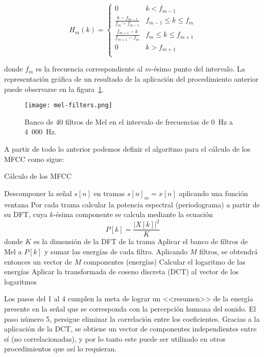 \begin{equation}
    \label{eq:Mel filterbank}
    H_m(k) = \begin{cases}
                 0 & k < f_{m-1} \\
                 \frac{k-f_{m-1}}{f_m - f_{m-1}} & f_{m-1}\leq k\leq f_m \\
                 \frac{f_{m+1}-k}{f_{m+1}-f_m} & f_m \leq k\leq f_{m+1} \\
                 0 & k > f_{m+1} \\
    \end{cases}
\end{equation}

\noindent
donde $f_m$ es la frecuencia correspondiente al $m$-ésimo punto del intervalo.
La representación gráfica de un resultado de la aplicación del procedimiento anterior puede observarse en la figura~\ref{img:mel-filters}.

\begin{figure}[!h]
    \centering
    \texttt{[image: mel-filters.png]}
    \caption{Banco de 40 filtros de Mel en el intervalo de frecuencias de 0~Hz a 4~000~Hz.}
    \label{img:mel-filters}
\end{figure}

A partir de todo lo anterior podemos definir el algoritmo para el cálculo de los MFCC como sigue:

\begin{algorithm}
    \caption{Cálculo de los MFCC}
    \label{algorithm:MFCC}
    Descomponer la señal $s[n]$ en tramas $s[n]_m = x[n]$ aplicando una función ventana\;
    Por cada trama calcular la potencia espectral (periodograma) a partir de su DFT, cuya $k$-ésima componente se calcula mediante la ecuación
    \begin{equation*}
        P[k] = \frac{|X[k]|^2}{K}
    \end{equation*}
    donde $K$ es la dimensión de la DFT de la trama\;
    Aplicar el banco de filtros de Mel a $P[k]$ y sumar las energías de cada filtro.
    Aplicando $M$ filtros, se obtendrá entonces un vector de $M$ componentes (energías)\;
    Calcular el logaritmo de las energías\;
    Aplicar la transformada de coseno discreta (DCT) al vector de los logaritmos\;
\end{algorithm}

Los pasos del 1 al 4 cumplen la meta de lograr un <<resumen>> de la energía presente en la señal que se corresponda con la percepción humana del sonido.
El paso número 5, persigue eliminar la correlación entre los coeficientes.
Gracias a la aplicación de la DCT, se obtiene un vector de componentes independientes entre sí (no correlacionadas), y por lo tanto este puede ser utilizado en otros procedimientos que así lo requieran.

